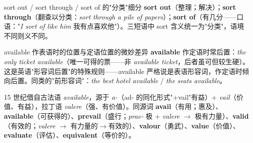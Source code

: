 \documentclass[../main.tex]{subfiles}
\begin{document}



\begin{gram}{sort out / sort through / sort of 的"分类"细分}
\textbf{sort out}（整理；解决）；\textbf{sort through}（翻查以分类：\textit{sort through a pile of papers}）；\textbf{sort of}（有几分——口语："\textit{I sort of like him} 我有点喜欢他"）。三短语中 sort 含义统一为"分类"，语境不同则义不同。
\end{gram}




\begin{gram}{available 作表语时的位置与定语位置的微妙差异}
\textbf{available} 作定语时常后置：\textit{the only ticket available}（唯一可得的票——非 \textit{available ticket}，后者虽可但较生硬）。这是英语"形容词后置"的特殊规则——available 严格说是表语形容词，作定语时倾向后置。同类的"前形容词"：\textit{the best hotel available} / \textit{the seats available}。
\end{gram}

\begin{origin}
15 世纪借自古法语 \textit{available}，源于 \textit{a-}（ad- 的同化形式"+vail"有益）+ \textit{vail}（价值、有益），拉丁语 \textit{valere}（强、有价值）。同源词 \textbf{avail}（有用；惠及）、\textbf{available}（可获得的）、\textbf{prevail}（盛行；\textit{prae-} 极 + \textit{valere} $\to$ 极有力量）、\textbf{valid}（有效的；\textit{valere} $\to$ 有力量的$\to$有效的）、\textbf{valour}（勇武）、\textbf{value}（价值）、\textbf{evaluate}（评估）、\textbf{equivalent}（等价的）。
\end{origin}

\end{document}
